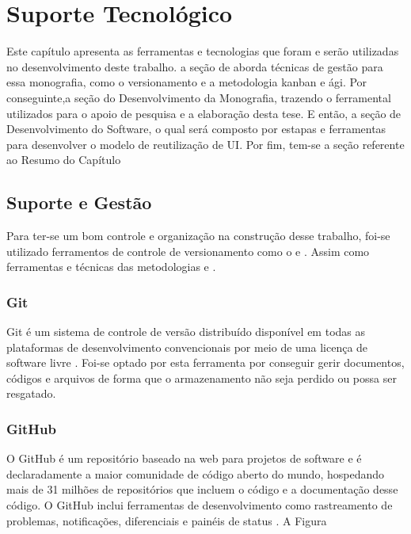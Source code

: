 \chapter{Suporte Tecnológico}

Este capítulo apresenta as ferramentas e tecnologias que foram e serão utilizadas no desenvolvimento deste trabalho. a seção de  aborda técnicas de gestão para essa monografia, como o versionamento e a metodologia kanban e ági. Por conseguinte,a seção do Desenvolvimento da Monografia, trazendo o ferramental utilizados para o apoio de pesquisa e a elaboração desta tese. E então, a seção de Desenvolvimento do Software, o qual será composto por estapas e ferramentas para desenvolver o modelo de reutilização de UI. Por fim, tem-se a seção referente ao Resumo do Capítulo

\section{Suporte e Gestão}
\label{sec:sg}

Para ter-se um bom controle e organização na construção desse trabalho, foi-se utilizado ferramentos de controle de versionamento como o  e . Assim como ferramentas e técnicas das metodologias  e .

\subsection{Git}
\label{sec:git}

Git é um sistema de controle de versão distribuído disponível em todas as plataformas de desenvolvimento convencionais por meio de uma licença de software livre \cite{6188603}. Foi-se optado por esta ferramenta por conseguir gerir documentos, códigos e arquivos de forma que o armazenamento não seja perdido ou possa ser resgatado.

\subsection{GitHub}
\label{sec:github}

O GitHub é um repositório baseado na web para projetos de software e é declaradamente a maior comunidade de código aberto do mundo, hospedando mais de 31 milhões de repositórios que incluem o código e a documentação desse código. O GitHub inclui ferramentas de desenvolvimento como rastreamento de problemas, notificações, diferenciais e painéis de status \cite{7740497}. A Figura

